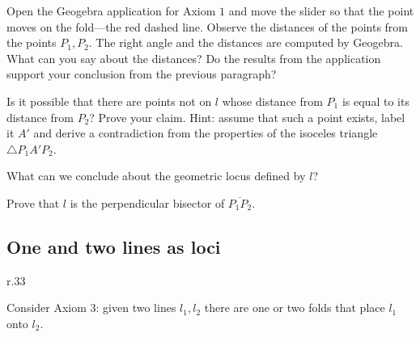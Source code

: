 Open the Geogebra application for Axiom $1$ and move the slider so that the point moves on the fold---the red dashed line. Observe the distances of the points from the points $P_1,P_2$. The right angle and the distances are computed by Geogebra. What can you say about the distances? Do the results from the application support your conclusion from the previous paragraph?

Is it possible that there are points not on $l$ whose distance from $P_1$ is equal to its distance from $P_2$? Prove your claim. Hint: assume that such a point exists, label it $A'$ and derive a contradiction from the properties of the isoceles triangle $\triangle P_1A'P_2$.

What can we conclude about the geometric locus defined by $l$?

Prove that $l$ is the perpendicular bisector of $\overline{P_1P_2}$.

\begin{center}
\end{center}


\subsection{One and two lines as loci}


\begin{wrapfigure}{r}{.33\textwidth}
\begin{center}
\end{center}
\end{wrapfigure}
Consider Axiom $3$: given two lines $l_1,l_2$ there are one or two folds that place $l_1$ onto $l_2$.


